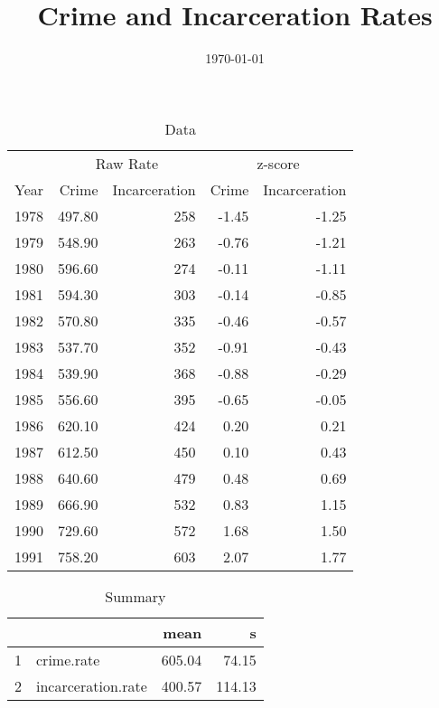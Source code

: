 \documentclass{exam}
\author{}
\title{Crime and Incarceration Rates}
\date{\today}
\begin{document}
  \maketitle

  \begin{table}[H]
    \centering
    \begin{tabular}{rrrrr}
      \toprule
      & \multicolumn{2}{c}{Raw Rate} & \multicolumn{2}{c}{z-score } \\
      \cmidrule(r){2-3} \cmidrule(r){4-5} 
      Year & Crime  & Incarceration & Crime & Incarceration \\
      \midrule
      1978 & 497.80 & 258           & -1.45 & -1.25 \\
      1979 & 548.90 & 263           & -0.76 & -1.21 \\
      1980 & 596.60 & 274           & -0.11 & -1.11 \\
      1981 & 594.30 & 303           & -0.14 & -0.85 \\
      1982 & 570.80 & 335           & -0.46 & -0.57 \\
      1983 & 537.70 & 352           & -0.91 & -0.43 \\
      1984 & 539.90 & 368           & -0.88 & -0.29 \\
      1985 & 556.60 & 395           & -0.65 & -0.05 \\
      1986 & 620.10 & 424           & 0.20  & 0.21 \\
      1987 & 612.50 & 450           & 0.10  & 0.43 \\
      1988 & 640.60 & 479           & 0.48  & 0.69 \\
      1989 & 666.90 & 532           & 0.83  & 1.15 \\
      1990 & 729.60 & 572           & 1.68  & 1.50 \\
      1991 & 758.20 & 603           & 2.07  & 1.77 \\
      \bottomrule
    \end{tabular}
    \caption{Data}
  \end{table}

  \begin{table}[ht]
    \centering
    \begin{tabular}{rlrr}
      \toprule
        &                    & mean   & s \\
      \midrule
      1 & crime.rate         & 605.04 & 74.15 \\
      2 & incarceration.rate & 400.57 & 114.13 \\
      \bottomrule
    \end{tabular}
    \caption{Summary}
  \end{table}
\end{document}
